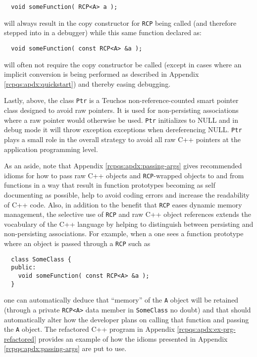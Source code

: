 \documentclass[pdf,ps2pdf,11pt]{SANDreport}
\begin{document}
{\small\begin{verbatim}
  void someFunction( RCP<A> a );
\end{verbatim}}

{}\noindent{}will always result in the copy constructor for
{}\texttt{RCP} being called (and therefore stepped into
in a debugger) while this same function declared as:

{\small\begin{verbatim}
  void someFunction( const RCP<A> &a );
\end{verbatim}}

{}\noindent{}will often not require the copy constructor be called
(except in cases where an implicit conversion is being performed as
described in Appendix {}\ref{rcpqs:apdx:quickstart}) and thereby
easing debugging.

Lastly, above, the class {}\texttt{Ptr} is a Teuchos non-reference-counted
smart pointer class designed to avoid raw pointers.  It is used for
non-persisting associations where a raw pointer would otherwise be used.
{}\texttt{Ptr} initializes to NULL and in debug mode it will throw exception
exceptions when dereferencing NULL.  {}\texttt{Ptr} plays a small role in the
overall strategy to avoid all raw C++ pointers at the application programming
level.

As an aside, note that Appendix {}\ref{rcpqs:apdx:passing-args} gives
recommended idioms for how to pass raw C++ objects and
{}\texttt{RCP}-wrapped objects to and from functions in
a way that result in function prototypes becoming as self documenting
as possible, help to avoid coding errors and increase the readability
of C++ code.  Also, in addition to the benefit that
{}\texttt{RCP} eases dynamic memory management, the
selective use of {}\texttt{RCP} and raw C++ object
references extends the vocabulary of the C++ language by helping to
distinguish between persisting and non-persisting associations.  For
example, when a one sees a function prototype where an object is
passed through a {}\texttt{RCP} such as

{\small\begin{verbatim}
  class SomeClass {
  public:
    void someFunction( const RCP<A> &a );
  }
\end{verbatim}}

{}\noindent{}one can automatically deduce that ``memory'' of the
{}\texttt{A} object will be retained (through a private
{}\texttt{RCP<A>} data member in {}\texttt{Some\-Class} no
doubt) and that should automatically alter how the developer plans on
calling that function and passing the {}\texttt{A} object.  The
refactored C++ program in Appendix
{}\ref{rcpqs:apdx:ex-prg-refactored} provides an example of how the
idioms presented in Appendix {}\ref{rcpqs:apdx:passing-args} are put
to use.
\end{document}
